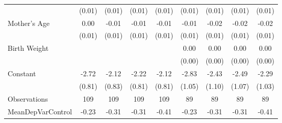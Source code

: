 {\begin{tabular}{l*{8}{c}}
                    &      (0.01)         &      (0.01)         &      (0.01)         &      (0.01)         &      (0.01)         &      (0.01)         &      (0.01)         &      (0.01)         \\
[1em]
Mother's Age        &        0.00         &       -0.01         &       -0.01         &       -0.01         &       -0.01         &       -0.02         &       -0.02         &       -0.02         \\
                    &      (0.01)         &      (0.01)         &      (0.01)         &      (0.01)         &      (0.01)         &      (0.01)         &      (0.01)         &      (0.01)         \\
[1em]
Birth Weight        &                     &                     &                     &                     &        0.00         &        0.00         &        0.00         &        0.00         \\
                    &                     &                     &                     &                     &      (0.00)         &      (0.00)         &      (0.00)         &      (0.00)         \\
[1em]
Constant            &       -2.72\sym{***}&       -2.12\sym{**} &       -2.22\sym{***}&       -2.12\sym{***}&       -2.83\sym{***}&       -2.43\sym{**} &       -2.49\sym{**} &       -2.29\sym{**} \\
                    &      (0.81)         &      (0.83)         &      (0.81)         &      (0.81)         &      (1.05)         &      (1.10)         &      (1.07)         &      (1.03)         \\
\hline
Observations        &         109         &         109         &         109         &         109         &          89         &          89         &          89         &          89         \\
MeanDepVarControl   &       -0.23         &       -0.31         &       -0.31         &       -0.41         &       -0.23         &       -0.31         &       -0.31         &       -0.41         \\
\hline\hline
\end{tabular}
}
